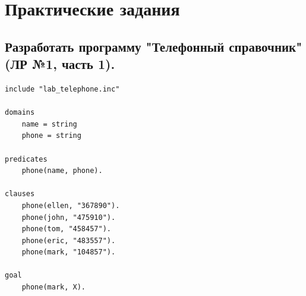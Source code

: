 \chapter{Практические задания}
\section{Разработать программу "Телефонный справочник" (ЛР №1, часть 1).}
\begin{lstlisting}[caption=Задание 1]
include "lab_telephone.inc"
	
domains
	name = string
	phone = string
	
predicates
	phone(name, phone).
	
clauses
	phone(ellen, "367890").
	phone(john, "475910").
	phone(tom, "458457").
	phone(eric, "483557").
	phone(mark, "104857").
	
goal
	phone(mark, X).
\end{lstlisting}

